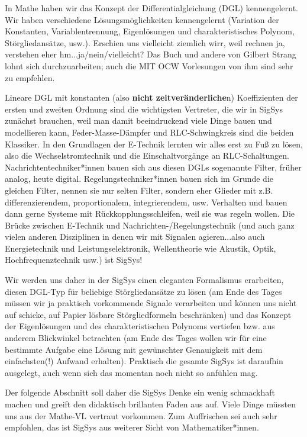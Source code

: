 In Mathe haben wir das Konzept der Differentialgleichung (DGL) kennengelernt.
%
Wir haben verschiedene Lösungsmöglichkeiten kennengelernt (Variation
der Konstanten, Variablentrennung, Eigenlösungen und charakteristisches Polynom,
Störgliedansätze, usw.). Erschien uns vielleicht ziemlich wirr, weil rechnen
ja, verstehen eher hm...ja/nein/vielleicht?
Das Buch \cite{Strang2014} und andere von Gilbert Strang
lohnt sich durchzuarbeiten; auch die MIT OCW Vorlesungen von ihm sind sehr zu empfehlen.


Lineare DGL mit konstanten (also \textbf{nicht zeitveränderliche}n) Koeffizienten der
ersten und zweiten Ordnung sind die wichtigsten Vertreter, die wir in SigSys
zunächst brauchen, weil man damit beeindruckend viele Dinge bauen und modellieren
kann, Feder-Masse-Dämpfer und RLC-Schwingkreis sind die beiden Klassiker.
%
In den Grundlagen der E-Technik lernten wir alles erst zu Fuß zu lösen, also
die Wechselstromtechnik und die Einschaltvorgänge an RLC-Schaltungen.
%
Nachrichtentechniker*innen bauen sich aus diesen DGLs sogenannte Filter,
früher analog, heute digital.
%
Regelungstechniker*innen bauen sich im Grunde die gleichen Filter, nennen sie nur
selten Filter, sondern eher Glieder mit z.B. differenzierendem, proportionalem,
integrierendem, usw. Verhalten und bauen dann gerne Systeme mit
Rückkopplungsschleifen, weil sie was regeln wollen.
%
Die Brücke zwischen E-Technik und Nachrichten-/Regelungstechnik (und auch
ganz vielen anderen Disziplinen in denen wir mit Signalen agieren...also
auch Energietechnik und Leistungselektronik, Wellentheorie wie
Akustik, Optik, Hochfrequenztechnik usw.) ist SigSys!

Wir werden uns daher in der SigSys einen eleganten Formalismus erarbeiten,
diesen DGL-Typ für beliebige Störgliedansätze zu lösen (am Ende des Tages
müssen wir ja praktisch vorkommende Signale verarbeiten und können uns nicht
auf schicke, auf Papier lösbare Störgliedformeln beschränken)
und das Konzept der Eigenlösungen und des charakteristischen
Polynoms vertiefen bzw. aus anderem Blickwinkel betrachten (am Ende des Tages
wollen wir für eine bestimmte Aufgabe eine Lösung mit gewünschter Genauigkeit
mit dem einfachsten(!) Aufwand erhalten). Praktisch die gesamte SigSys ist daraufhin
ausgelegt, auch wenn sich das momentan noch nicht so anfühlen mag.

Der folgende Abschnitt soll daher die SigSys Denke ein wenig schmackhaft machen und
greift den didaktisch brillanten Faden aus \cite{Strang2014} auf. Viele Dinge
müssten uns aus der Mathe-VL vertraut vorkommen.
%
Zum Auffrischen sei auch \cite{Burg2013} sehr empfohlen, das ist SigSys aus weiterer
Sicht von Mathematiker*innen.
%
